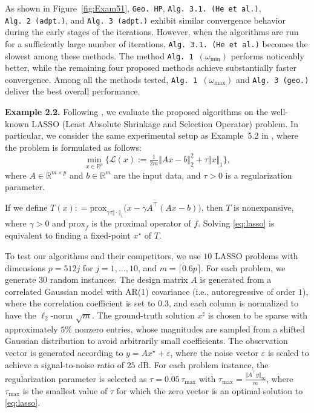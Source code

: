 \documentclass{article}
\theoremstyle{plain}
\theoremstyle{definition}
\newcommand{\R}{\mathbb{R}}
\newcommand{\norms}[1]{\Vert#1\Vert}
\newcommand{\Lc}{\mathcal{L}}
\newcommand{\0}{\boldsymbol{0}}
\begin{document}
As shown in Figure~\ref{fig:Exam51}, \texttt{Geo.~HP}, \texttt{Alg.~3.1.~(He et al.)}, \texttt{Alg.~2~(adpt.)}, and \texttt{Alg.~3~(adpt.)} exhibit similar convergence behavior during the early stages of the iterations. 
However, when the algorithms are run for a sufficiently large number of iterations, \texttt{Alg.~3.1.~(He et al.)} becomes the slowest among these methods. 
The method \texttt{Alg.~1~$(\omega_{\min})$} performs noticeably better, while the remaining four proposed methods achieve substantially faster convergence.
Among all the methods tested, \texttt{Alg.~1~$(\omega_{\max})$} and \texttt{Alg.~3~(geo.)} deliver the best overall performance.

\vspace{2ex}
\noindent\textbf{Example 2.2.} 
Following \cite{he2024convergence}, we evaluate the proposed algorithms on the well-known LASSO (Least Absolute Shrinkage and Selection Operator) problem. 
In particular, we consider the same experimental setup as Example~5.2 in \cite{he2024convergence}, where the problem is formulated as follows:
\begin{equation}\label{eq:lasso}
\min_{x \in \R^p} \Big\{\Lc(x) := \tfrac{1}{2m}\norms{Ax - b}^2_2 + \tau \norms{x}_1 \Big\},
\end{equation}
where $A \in \R^{m\times p}$ and $b \in \R^m$ are the input data, and $\tau > 0$ is a regularization parameter.

If we define $T(x) : = \mathrm{prox}_{\gamma\tau\norms{\cdot}_1}\big(x - \gamma A^{\top}(Ax - b) \big)$, then $T$ is nonexpansive, where $\gamma > 0$ and $\mathrm{prox}_f$ is the proximal operator of $f$.
Solving \eqref{eq:lasso} is equivalent to finding a fixed-point $x^{\star}$ of $T$.

To test our algorithms and their competitors, we use $10$ LASSO problems with dimensions $p = 512j$ for $j = 1,\ldots,10$, and $m = \lceil0.6p\rceil$. 
For each problem, we generate $30$ random instances.
The design matrix $A$ is generated from a correlated Gaussian model with AR(1) covariance (i.e., autoregressive of order $1$), where the correlation coefficient is set to $0.3$, and each column is normalized to have the $\ell_2$-norm $\sqrt{m}$. 
The ground-truth solution $x^{\sharp}$ is chosen to be sparse with approximately $5\%$ nonzero entries, whose magnitudes are sampled from a shifted Gaussian distribution to avoid arbitrarily small coefficients. 
The observation vector is generated according to $y=Ax^\star+\varepsilon$, where the noise vector $\varepsilon$ is scaled to achieve a signal-to-noise ratio of $25$ dB. 
For each problem instance, the regularization parameter is selected as $\tau = 0.05\,\tau_{\max}$ with $\tau_{\max}=\frac{\norms{A^\top y}_\infty}{m}$, where $\tau_{\max}$ is the smallest value of $\tau$ for which the zero vector is an optimal solution to \eqref{eq:lasso}.
\end{document}
